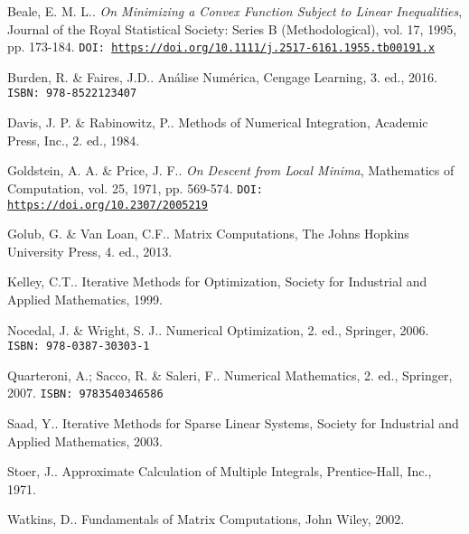\documentclass[12pt]{book}
\begin{document}
\begin{thebibliography}{99}
  
    Beale, E. M. L.. \textit{On Minimizing a Convex Function Subject to Linear Inequalities}, Journal of the Royal Statistical Society: Series B (Methodological), vol. 17, 1995, pp. 173-184. \texttt{DOI: \url{https://doi.org/10.1111/j.2517-6161.1955.tb00191.x}}

    Burden, R. \& Faires, J.D.. Análise Numérica, Cengage Learning, 3. ed., 2016. \texttt{ISBN: 978-8522123407}

    Davis, J. P. \& Rabinowitz, P.. Methods of Numerical Integration, Academic Press, Inc., 2. ed., 1984.

    Goldstein, A. A. \& Price, J. F.. \textit{On Descent from Local Minima}, Mathematics of Computation, vol. 25, 1971, pp. 569-574. \texttt{DOI: \url{https://doi.org/10.2307/2005219}}

    Golub, G. \& Van Loan, C.F.. Matrix Computations, The Johns Hopkins University Press, 4. ed., 2013.

    Kelley, C.T.. Iterative Methods for Optimization, Society for Industrial and Applied Mathematics, 1999.
  
    Nocedal, J. \& Wright, S. J.. Numerical Optimization, 2. ed., Springer, 2006. \texttt{ISBN: 978-0387-30303-1}

    Quarteroni, A.; Sacco, R. \& Saleri, F.. Numerical Mathematics, 2. ed., Springer, 2007. \texttt{ISBN: 9783540346586}

    Saad, Y.. Iterative Methods for Sparse Linear Systems, Society for Industrial and Applied Mathematics, 2003.

    Stoer, J.. Approximate Calculation of Multiple Integrals, Prentice-Hall, Inc., 1971.

    Watkins, D.. Fundamentals of Matrix Computations, John Wiley, 2002.
      
\end{thebibliography}

\ifisbook
\printindex
\fi
  
\end{document}
